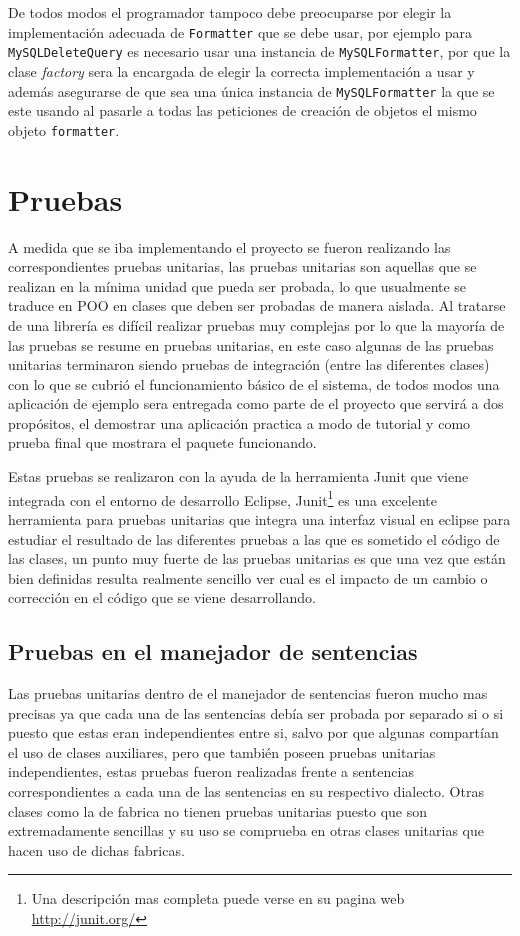 De todos modos el programador tampoco debe preocuparse por elegir la implementación adecuada de \verb=Formatter= que se debe usar, por ejemplo para \verb=MySQLDeleteQuery= es necesario usar una instancia de \verb=MySQLFormatter=, por que la clase \textit{factory} sera la encargada de elegir la correcta implementación a usar y además asegurarse de que sea una única instancia de \verb=MySQLFormatter= la que se este usando al pasarle a todas las peticiones de creación de objetos el mismo objeto \verb=formatter=.
%
%
\section{Pruebas}
A medida que se iba implementando el proyecto se fueron realizando las correspondientes pruebas unitarias, las pruebas unitarias son aquellas que se realizan en la mínima unidad que pueda ser probada, lo que usualmente se traduce en POO en clases que deben ser probadas de manera aislada. Al tratarse de una librería es difícil realizar pruebas muy complejas por lo que la mayoría de las pruebas se resume en pruebas unitarias, en este caso algunas de las pruebas unitarias terminaron siendo pruebas de integración (entre las diferentes clases) con lo que se cubrió el funcionamiento básico de el sistema, de todos modos una aplicación de ejemplo sera entregada como parte de el proyecto que servirá a dos propósitos, el demostrar una aplicación practica a modo de tutorial y como prueba final que mostrara el paquete funcionando.

Estas pruebas se realizaron con la ayuda de la herramienta Junit que viene integrada con el entorno de desarrollo Eclipse, Junit\footnote{Una descripción mas completa puede verse en su pagina web \url{http://junit.org/}} es una excelente herramienta para pruebas unitarias que integra una interfaz visual en eclipse para estudiar el resultado de las diferentes pruebas a las que es sometido el código de las clases, un punto muy fuerte de las pruebas unitarias es que una vez que están bien definidas resulta realmente sencillo ver cual es el impacto de un cambio o corrección en el código que se viene desarrollando.
%
\subsection{Pruebas en el manejador de sentencias}
Las pruebas unitarias dentro de el manejador de sentencias fueron mucho mas precisas ya que cada una de las sentencias debía ser probada por separado si o si puesto que estas eran independientes entre si, salvo por que algunas compartían el uso de clases auxiliares, pero que también poseen pruebas unitarias independientes, estas pruebas fueron realizadas frente a sentencias correspondientes a cada una de las sentencias en su respectivo dialecto. Otras clases como la de fabrica no tienen pruebas unitarias puesto que son extremadamente sencillas y su uso se comprueba en otras clases unitarias que hacen uso de dichas fabricas.

